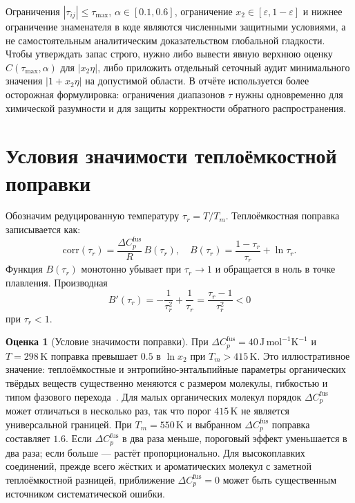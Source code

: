 \documentclass[11pt]{article}
\newcommand{\dCpfus}{\Delta C_p^{\mathrm{fus}}}
\theoremstyle{definition}
\newtheorem{estimate}{Оценка}[section]
\begin{document}
Ограничения $|\tau_{ij}|\le\tau_{\max}$, $\alpha\in[0.1,0.6]$, ограничение $x_2\in[\varepsilon,1-\varepsilon]$ и нижнее ограничение знаменателя в коде являются численными защитными условиями, а не самостоятельным аналитическим доказательством глобальной гладкости. Чтобы утверждать запас строго, нужно либо вывести явную верхнюю оценку $C(\tau_{\max},\alpha)$ для $|x_2\eta|$, либо приложить отдельный сеточный аудит минимального значения $|1+x_2\eta|$ на допустимой области. В отчёте используется более осторожная формулировка: ограничения диапазонов $\tau$ нужны одновременно для химической разумности и для защиты корректности обратного распространения.

\section{Условия значимости теплоёмкостной поправки}
\label{app:dcp-significance}

Обозначим редуцированную температуру $\tau_r = T/T_m$. Теплоёмкостная поправка записывается как:
\begin{equation}
    \mathrm{corr}(\tau_r) = \frac{\dCpfus}{R} \, B(\tau_r),
    \quad
    B(\tau_r) = \frac{1-\tau_r}{\tau_r} + \ln\tau_r.
\end{equation}
Функция $B(\tau_r)$ монотонно убывает при $\tau_r \to 1$ и обращается в ноль в точке плавления. Производная
\begin{equation*}
    B'(\tau_r)=-\frac{1}{\tau_r^2}+\frac{1}{\tau_r}
    =\frac{\tau_r-1}{\tau_r^2}<0
\end{equation*}
при $\tau_r < 1$.

\begin{estimate}[Условие значимости поправки]
При $\dCpfus = 40\,\mathrm{J\,mol^{-1}K^{-1}}$ и $T = 298\,\mathrm K$ поправка превышает $0.5$ в $\ln x_2$ при $T_m > 415\,\mathrm K$. Это иллюстративное значение: теплоёмкостные и энтропийно-энтальпийные параметры органических твёрдых веществ существенно меняются с размером молекулы, гибкостью и типом фазового перехода~\cite{yalkowsky1979,acree2010}. Для малых органических молекул порядок $\Delta C_p^{\mathrm{fus}}$ может отличаться в несколько раз, так что порог $415\,\mathrm K$ не является универсальной границей. При $T_m = 550\,\mathrm K$ и выбранном $\dCpfus$ поправка составляет $1.6$. Если $\dCpfus$ в два раза меньше, пороговый эффект уменьшается в два раза; если больше --- растёт пропорционально. Для высокоплавких соединений, прежде всего жёстких и ароматических молекул с заметной теплоёмкостной разницей, приближение $\dCpfus = 0$ может быть существенным источником систематической ошибки.
\end{estimate}
\end{document}
